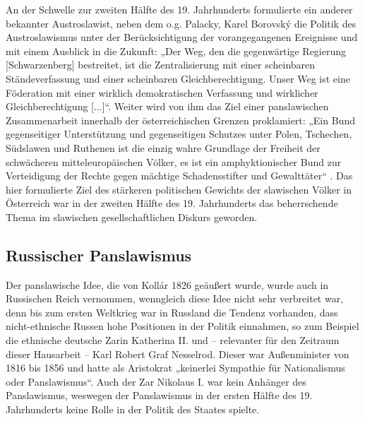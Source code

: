 \documentclass[12pt,headsepline,a4paper]{scrartcl}
\begin{document}
An der Schwelle zur zweiten Hälfte des 19. Jahrhunderts formulierte ein anderer bekannter
Austroslawist, neben dem o.g. Palacky, Karel Borovský die Politik des Austroslawismus unter
der Berücksichtigung der vorangegangenen Ereignisse und mit einem Ausblick in die Zukunft:
„Der Weg, den die gegenwärtige Regierung [Schwarzenberg] bestreitet, ist die Zentralisierung
mit einer scheinbaren Ständeverfassung und einer scheinbaren Gleichberechtigung. Unser
Weg ist eine Föderation mit einer wirklich demokratischen Verfassung und wirklicher
Gleichberechtigung [...]“. Weiter wird von ihm das Ziel einer panslawischen Zusammenarbeit
innerhalb der österreichischen Grenzen proklamiert: „Ein Bund gegenseitiger Unterstützung
und gegenseitigen Schutzes unter Polen, Tschechen, Südslawen und Ruthenen ist die einzig
wahre Grundlage der Freiheit der schwächeren mitteleuropäischen Völker, es ist ein
amphyktionischer Bund zur Verteidigung der Rechte gegen mächtige Schadensstifter und
Gewalttäter“%
.
Das hier formulierte Ziel des stärkeren politischen Gewichts der slawischen Völker in
Österreich war in der zweiten Hälfte des 19. Jahrhunderts das beherrschende Thema im
slawischen gesellschaftlichen Diskurs geworden.

\subsection{Russischer Panslawismus}
Der panslawische Idee, die von Kollár 1826 geäußert wurde, wurde auch in Russischen Reich
vernommen, wenngleich diese Idee nicht sehr verbreitet war, denn bis zum ersten Weltkrieg
war in Russland die Tendenz vorhanden, dass nicht-ethnische Russen hohe Positionen in der
Politik einnahmen, so zum Beispiel die ethnische deutsche Zarin Katherina II. und –
relevanter für den Zeitraum dieser Hausarbeit – Karl Robert Graf Nesselrod. Dieser war
Außenminister von 1816 bis 1856 und hatte als Aristokrat „keinerlei Sympathie für
Nationalismus oder Panslawismus“\autocite[115]{kohn}. Auch der Zar Nikolaus I. war kein
Anhänger des Panslawismus, weswegen der Panslawismus in der ersten Hälfte des 19.
Jahrhunderts keine Rolle in der Politik des Staates spielte.
\end{document}
